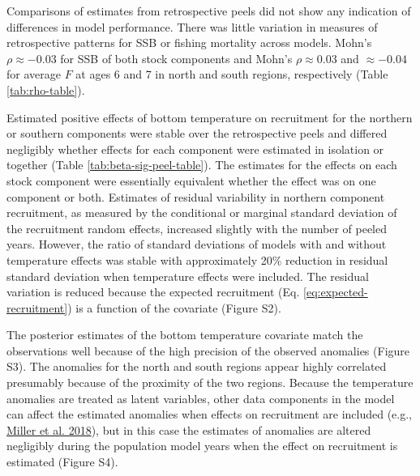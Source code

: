 \documentclass[
]{article}
\begin{document}
Comparisons of estimates from retrospective peels did not show any indication of differences in model performance. There was little variation in measures of retrospective patterns for SSB or fishing mortality across models. Mohn's \(\rho \approx -0.03\) for SSB of both stock components and Mohn's \(\rho \approx 0.03\) and \(\approx -0.04\) for average \(F\) at ages 6 and 7 in north and south regions, respectively (Table \ref{tab:rho-table}).

Estimated positive effects of bottom temperature on recruitment for the northern or southern components were stable over the retrospective peels and differed negligibly whether effects for each component were estimated in isolation or together (Table \ref{tab:beta-sig-peel-table}). The estimates for the effects on each stock component were essentially equivalent whether the effect was on one component or both. Estimates of residual variability in northern component recruitment, as measured by the conditional or marginal standard deviation of the recruitment random effects, increased slightly with the number of peeled years. However, the ratio of standard deviations of models with and without temperature effects was stable with approximately 20\% reduction in residual standard deviation when temperature effects were included. The residual variation is reduced because the expected recruitment (Eq. \ref{eq:expected-recruitment}) is a function of the covariate (Figure S2).

The posterior estimates of the bottom temperature covariate match the observations well because of the high precision of the observed anomalies (Figure S3). The anomalies for the north and south regions appear highly correlated presumably because of the proximity of the two regions. Because the temperature anomalies are treated as latent variables, other data components in the model can affect the estimated anomalies when effects on recruitment are included (e.g., \protect\hyperlink{ref-milleretal18}{Miller et al. 2018}), but in this case the estimates of anomalies are altered negligibly during the population model years when the effect on recruitment is estimated (Figure S4).
\end{document}
